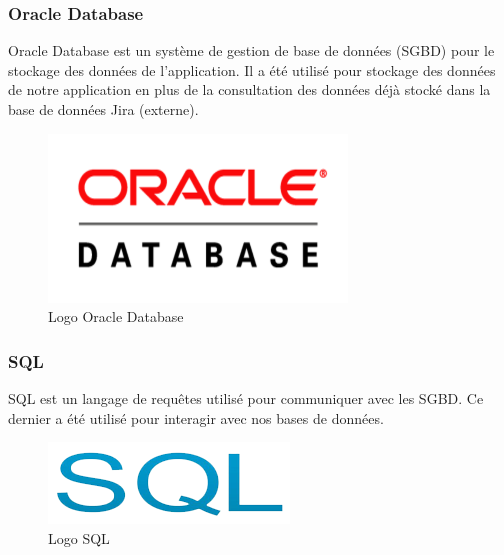 \subsubsection{Oracle Database}
\noindent\begin{minipage}{0.69\textwidth}
Oracle Database est un système de gestion de base de données (SGBD) pour le stockage des données de l'application. Il a été utilisé pour stockage des données de notre application en plus de la consultation des données déjà stocké dans la base de données Jira (externe).
\end{minipage}
\begin{minipage}{0.3\textwidth}
\begin{figure}[H]
  \centering
  \includegraphics[scale=0.4]{figures/logo/oracle_database.png}
  \caption{Logo Oracle Database}
  \label{code50}
\end{figure}
\end{minipage}
\subsubsection{SQL}
\noindent\begin{minipage}{0.69\textwidth}
SQL est un langage de requêtes utilisé pour communiquer avec les SGBD. Ce dernier a été utilisé pour interagir avec nos bases de données.
\end{minipage}
\begin{minipage}{0.3\textwidth}
\begin{figure}[H]
  \centering
  \includegraphics[scale=0.4]{figures/logo/sql.png}
  \caption{Logo SQL}
  \label{code51}
\end{figure}
\end{minipage}
